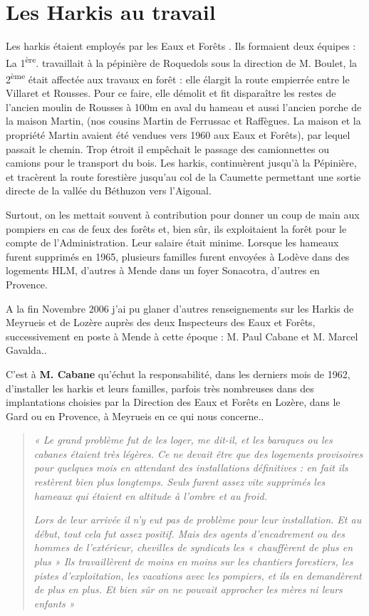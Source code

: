 \section*{Les Harkis au travail}

Les harkis étaient employés par les \og Eaux et Forêts \fg{}. Ils formaient deux équipes :
La 1\textsuperscript{ère}. travaillait à la pépinière de Roquedols sous la direction de M. Boulet, la 2\textsuperscript{ème}
était affectée aux travaux en forêt : elle élargit la route empierrée entre le Villaret et
Rousses. Pour ce faire, elle démolit et fit disparaître les restes de l’ancien moulin de
Rousses à 100m en aval du hameau et aussi l’ancien porche de la maison Martin, (nos
cousins Martin de Ferrussac et Raffègues. La maison et la propriété Martin avaient été vendues vers
1960 aux Eaux et Forêts), par lequel passait le chemin. Trop étroit il empêchait le passage
des camionnettes ou camions pour le transport du bois.
Les harkis, continuèrent jusqu’à la Pépinière, et tracèrent la route forestière
jusqu’au col de la Caumette permettant une sortie directe de la vallée du Béthuzon vers
l’Aigoual.

Surtout, on les mettait souvent à contribution pour donner un coup de main aux
pompiers en cas de feux des forêts et, bien sûr, ils exploitaient la forêt pour le compte
de l’Administration. Leur salaire était minime.
Lorsque les hameaux furent supprimés en 1965, plusieurs familles furent envoyées à
Lodève dans des logements HLM, d’autres à Mende dans un foyer Sonacotra, d’autres
en Provence.

A la fin Novembre 2006 j’ai pu glaner d’autres renseignements sur les Harkis de
Meyrueis et de Lozère auprès des deux Inspecteurs des Eaux et Forêts, successivement
en poste à Mende à cette époque : M. Paul Cabane et M. Marcel Gavalda..

C’est à \textbf{M. Cabane} qu’échut la responsabilité, dans les derniers mois de
1962, d’installer les harkis et leurs familles, parfois très nombreuses dans des
implantations choisies par la Direction des Eaux et Forêts en Lozère, dans le Gard ou
en Provence, à Meyrueis en ce qui nous concerne..

\begin{quote}
\textit{« Le grand problème fut de les loger, me dit-il, et les baraques ou les cabanes
étaient très légères. Ce ne devait être que des logements provisoires pour quelques
mois en attendant des installations définitives : en fait ils restèrent bien plus
longtemps. Seuls furent assez vite supprimés les hameaux qui étaient en altitude à
l’ombre et au froid.}

\textit{Lors de leur arrivée il n’y eut pas de problème pour leur installation. Et au début,
tout cela fut assez positif. Mais des agents d’encadrement ou des hommes de
l’extérieur, chevilles de syndicats les « chauffèrent de plus en plus » Ils travaillèrent
de moins en moins sur les chantiers forestiers, les pistes d’exploitation, les vacations
avec les pompiers, et ils en demandèrent de plus en plus. Et bien sûr on ne pouvait
approcher les mères ni leurs enfants »}
\end{quote}

